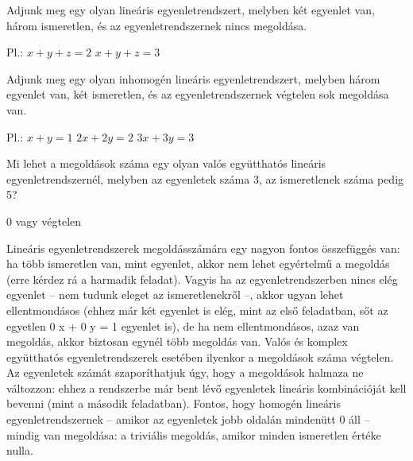 \begin{frame}
  \begin{tcolorbox}[title={5/1. -N-}]
      Adjunk meg egy olyan lineáris egyenletrendszert, melyben két egyenlet van, három ismeretlen, és az egyenletrendszernek nincs megoldása.
  \tcblower

    \mmedskip 
    
    Pl.:
$x + y + z = 2$
$x + y + z = 3$
  \end{tcolorbox}
\end{frame}


\begin{frame}
  \begin{tcolorbox}[title={5/2. -N-}]
      Adjunk meg egy olyan inhomogén lineáris egyenletrendszert, melyben három egyenlet van, két ismeretlen, és az egyenletrendszernek végtelen sok megoldása van.
  \tcblower

    \mmedskip 
    
    Pl.:
$x + y = 1$
$2x + 2y = 2$
$3x + 3y = 3$

  \end{tcolorbox}
\end{frame}


\begin{frame}
  \begin{tcolorbox}[title={5/3. -N-}]
      Mi lehet a megoldások száma egy olyan valós együtthatós lineáris egyenletrendszernél, melyben az egyenletek száma 3, az ismeretlenek száma pedig 5?
  \tcblower

    \mmedskip 
    
    0 vagy végtelen
  \end{tcolorbox}
\end{frame}


\begin{frame}
  \begin{tcolorbox}[title={5/3. -N-}]
Lineáris egyenletrendszerek megoldásszámára egy nagyon fontos összefüggés van: ha több ismeretlen van, mint egyenlet, akkor nem lehet egyértelmű a megoldás (erre kérdez rá a harmadik feladat). Vagyis ha az egyenletrendszerben nincs elég egyenlet – nem tudunk eleget az ismeretlenekről –, akkor ugyan lehet ellentmondásos (ehhez már két egyenlet is elég, mint az első feladatban, sőt az egyetlen 0 \cdot x + 0 \cdot y = 1 egyenlet is), de ha nem ellentmondásos, azaz van megoldás, akkor biztosan egynél több megoldás van. Valós és komplex együtthatós egyenletrendszerek esetében ilyenkor a megoldások száma végtelen. Az egyenletek számát szaporíthatjuk úgy, hogy a megoldások halmaza ne változzon: ehhez a rendszerbe már bent lévő egyenletek lineáris kombinációját kell bevenni (mint a második feladatban). Fontos, hogy homogén lineáris egyenletrendszernek – amikor az egyenletek jobb oldalán mindenütt 0 áll – mindig van megoldása: a triviális megoldás, amikor minden ismeretlen értéke nulla.
  \end{tcolorbox}
\end{frame}



